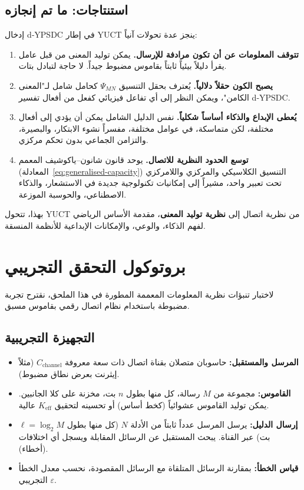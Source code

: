 \documentclass[12pt,a4paper]{article}
\newcommand{\Keff}{K_{\mathrm{eff}}}
\theoremstyle{remark}
\begin{document}
	\subsection{استنتاجات: ما تم إنجازه}
	\label{subsec:conclusions-dypsdc}
	
	إدخال d‑YPSDC في إطار YUCT ينجز عدة تحولات آنياً:
	
	\begin{enumerate}[leftmargin=*]
		\item \textbf{تتوقف المعلومات عن أن تكون مرادفة للإرسال.}
		يمكن توليد المعنى من قبل عامل يقرأ دليلاً بيئياً ثابتاً بقاموس مضبوط جيداً. لا حاجة لتبادل بتات.
		\item \textbf{يصبح الكون حقلاً دلالياً.}
		يُعترف بحقل التنسيق \(\Psi_{MN}\) كحامل شامل لـ"المعنى الكامن"، ويمكن النظر إلى أي تفاعل فيزيائي كفعل من أفعال تفسير d‑YPSDC.
		\item \textbf{يُعطى الإبداع والذكاء أساساً شكلياً.}
		نفس الدليل الشامل يمكن أن يؤدي إلى أفعال مختلفة، لكن متماسكة، في عوامل مختلفة، مفسراً نشوء الابتكار، والبصيرة، والتزامن الجماعي بدون تحكم مركزي.
		\item \textbf{توسع الحدود النظرية للاتصال.}
		يوحد قانون شانون–ياكوشيف المعمم (المعادلة~\ref{eq:generalised-capacity}) التنسيق الكلاسيكي والمركزي واللامركزي تحت تعبير واحد، مشيراً إلى إمكانيات تكنولوجية جديدة في الاستشعار، والذكاء الاصطناعي، والحوسبة الموزعة.
	\end{enumerate}
	
	بهذا، تتحول YUCT من نظرية اتصال إلى \textbf{نظرية توليد المعنى}، مقدمة الأساس الرياضي لفهم الذكاء، والوعي، والإمكانات الإبداعية للأنظمة المنسقة.
	
	\section{بروتوكول التحقق التجريبي}
	\label{sec:experiment}
	
	لاختبار تنبؤات نظرية المعلومات المعممة المطورة في هذا الملحق، نقترح تجربة مضبوطة باستخدام نظام اتصال رقمي بقاموس مسبق.
	
	\subsection{التجهيزة التجريبية}
	
	\begin{itemize}
		\item \textbf{المرسل والمستقبل:} حاسوبان متصلان بقناة اتصال ذات سعة معروفة \(C_{\text{channel}}\) (مثلاً إيثرنت بعرض نطاق مضبوط).
		\item \textbf{القاموس:} مجموعة من \(M\) رسالة، كل منها بطول \(n\) بت، مخزنة على كلا الجانبين. يمكن توليد القاموس عشوائياً (كخط أساس) أو تحسينه لتحقيق \(\Keff\) عالية.
		\item \textbf{إرسال الدليل:} يرسل المرسل عدداً ثابتاً من الأدلة \(N\) (كل منها بطول \(\ell = \log_2 M\) بت) عبر القناة. يبحث المستقبل عن الرسائل المقابلة ويسجل أي اختلافات (أخطاء).
		\item \textbf{قياس الخطأ:} بمقارنة الرسائل المتلقاة مع الرسائل المقصودة، نحسب معدل الخطأ التجريبي \(\varepsilon\).
	\end{itemize}
	
\end{document}
